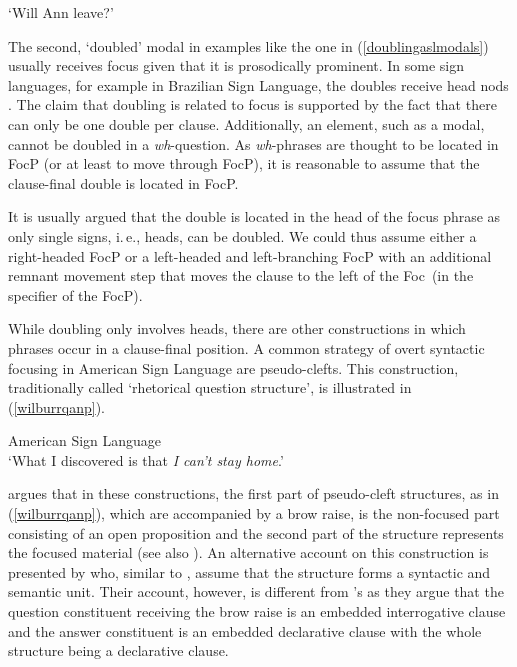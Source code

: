\begin{exe}
\ex {}
\glt `Will Ann leave?' \label{doublingaslmodals}
\end{exe}

\noindent The second, `doubled' modal in examples like the one in (\ref{doublingaslmodals}) usually receives focus given that it is prosodically prominent. In some sign languages, for example in Brazilian Sign Language, the doubles receive head nods \citep{de1999phrase}. The claim that doubling is related to focus is supported by the fact that there can only be one double per clause. Additionally, an element, such as a modal, cannot be doubled in a \textit{wh}-question. As \textit{wh}-phrases are thought to be located in FocP (or at least to move through FocP), it is reasonable to assume that the clause-final double is located in FocP. 

It is usually argued that the double is located in the head of the focus phrase as only single signs, i.\,e., heads, can be doubled. We could thus assume either a right-headed FocP or a left-headed and left-branching FocP with an additional remnant movement step that moves the clause to the left of the Foc\textdegree\ (in the specifier of the FocP).  

While doubling only involves heads, there are other constructions in which phrases occur in a clause-final position. \label{pseudocleeeeefts}A common strategy of overt syntactic focusing in American Sign Language are pseudo-clefts. This construction, traditionally called `rhetorical question structure', is illustrated in (\ref{wilburrqanp}).

\begin{exe}
\ex American Sign Language \citep[92]{wilbur1997prosodic} \\  
\glt `What I discovered is that \textit{I can't stay home}.' \label{wilburrqanp}
\end{exe}

\noindent \citet{wilbur1997prosodic} argues that in these constructions, the first part of pseudo-cleft structures, as in (\ref{wilburrqanp}), which are accompanied by a brow raise, is the non-focused part consisting of an open proposition and the second part of the structure represents the focused material (see also \citealt{wilbur1994foregrounding, wilbur1996evidence}). An alternative account on this construction is presented by \citet{caponigro2011ask} who, similar to \citet{wilbur1996evidence}, assume that the structure forms a syntactic and semantic unit. Their account, however, is different from \citeauthor{wilbur1996evidence}'s as they argue that the question constituent receiving the brow raise is an embedded interrogative clause and the answer constituent is an embedded declarative clause with the whole structure being a declarative clause. 

